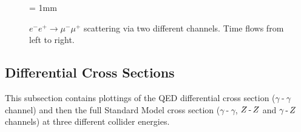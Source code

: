\documentclass[]{article}
\begin{document}
\begin{figure}[H]
	\vspace{10pt}
	\unitlength = 1mm
	\centering
	\qquad
	\caption{$e^{-}e^{+}\to\mu^{-}\mu^{+}$ scattering via two different channels. Time flows from left to right.}
\end{figure}

\subsection{Differential Cross Sections}\label{ssec:differentialfigs}

This subsection contains plottings of the QED differential cross section ($\gamma\operatorname{-}\gamma$ channel) and then the full Standard Model cross section ($\gamma\operatorname{-}\gamma$, $Z \operatorname{-}Z $ and $\gamma\operatorname{-}Z $ channels) at three different collider energies.
\end{document}

